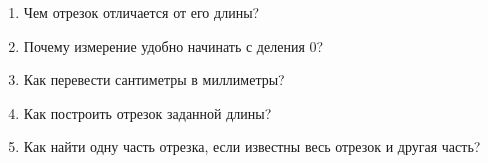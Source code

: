 \begin{questionsbox}
  \begin{enumerate}
    \item Чем отрезок отличается от его длины?
    \item Почему измерение удобно начинать с деления \(0\)?
    \item Как перевести сантиметры в миллиметры?
    \item Как построить отрезок заданной длины?
    \item Как найти одну часть отрезка, если известны весь отрезок и другая часть?
  \end{enumerate}
\end{questionsbox}
